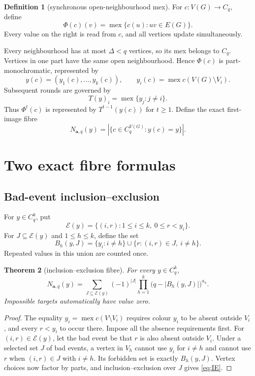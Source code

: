 \documentclass[11pt,a4paper]{amsart}
\newtheorem{theorem}{Theorem}[section]
\theoremstyle{definition}
\newtheorem{definition}[theorem]{Definition}
\theoremstyle{remark}
\newcommand{\mex}{\operatorname{mex}}
\newcommand{\PhiG}{\Phi}
\newcommand{\Cq}{C_q}
\begin{document}
\begin{definition}[synchronous open-neighbourhood mex]\label{def:map}
For \(c:V(G)\to\Cq\), define
\[
 \PhiG(c)(v)=\mex\{c(u):uv\in E(G)\}.
\]
Every value on the right is read from \(c\), and all vertices update
simultaneously.
\end{definition}

Every neighbourhood has at most \(\Delta<q\) vertices, so its mex belongs to
\(\Cq\).  Vertices in one part have the same open neighbourhood.  Hence
\(\PhiG(c)\) is part-monochromatic, represented by
\[
 y(c)=(y_1(c),\ldots,y_k(c)),\qquad
 y_i(c)=\mex c(V(G)\setminus V_i).
\]
Subsequent rounds are governed by
\begin{equation}\label{eq:T}
                    T(y)_i=\mex\{y_j:j\ne i\}.
\end{equation}
Thus \(\PhiG^t(c)\) is represented by \(T^{t-1}(y(c))\) for \(t\ge1\).
Define the exact first-image fibre
\[
 N_{\mathbf a,q}(y)=|\{c\in\Cq^{V(G)}:y(c)=y\}|.
\]

\section{Two exact fibre formulas}

\subsection{Bad-event inclusion--exclusion}

For \(y\in\Cq^k\), put
\[
 \mathcal E(y)=\{(i,r):1\le i\le k,\ 0\le r<y_i\}.
\]
For \(J\subseteq\mathcal E(y)\) and \(1\le h\le k\), define the set
\[
 B_h(y,J)=\{y_i:i\ne h\}
 \cup\{r:(i,r)\in J,\ i\ne h\}.
\]
Repeated values in this union are counted once.

\begin{theorem}[inclusion--exclusion fibre]\label{thm:IE}
For every \(y\in\Cq^k\),
\begin{equation}\label{eq:IE}
 \boxed{
 N_{\mathbf a,q}(y)=
 \sum_{J\subseteq\mathcal E(y)}(-1)^{|J|}
 \prod_{h=1}^k\bigl(q-|B_h(y,J)|\bigr)^{a_h}.}
\end{equation}
Impossible targets automatically have value zero.
\end{theorem}

\begin{proof}
The equality \(y_i=\mex c(V\setminus V_i)\) requires colour \(y_i\) to be
absent outside \(V_i\), and every \(r<y_i\) to occur there.  Impose all the
absence requirements first.  For \((i,r)\in\mathcal E(y)\), let the bad
event be that \(r\) is also absent outside \(V_i\).  Under a selected set
\(J\) of bad events, a vertex in \(V_h\) cannot use \(y_i\) for \(i\ne h\)
and cannot use \(r\) when \((i,r)\in J\) with \(i\ne h\).  Its forbidden
set is exactly \(B_h(y,J)\).  Vertex choices now factor by parts, and
inclusion--exclusion over \(J\) gives \eqref{eq:IE}.
\end{proof}
\end{document}
